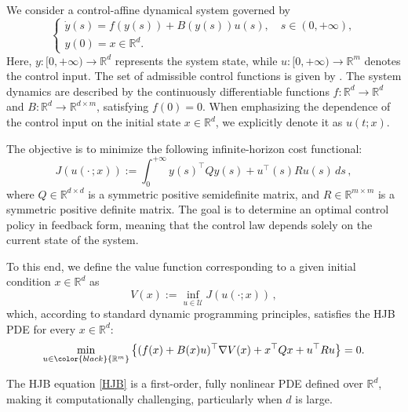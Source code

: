 \documentclass{article}
\newcommand{\second}[1]{{\color{black}{#1}}}
\begin{document}
We consider a control-affine dynamical system governed by  
\begin{equation}\label{eq}
\left\{ \begin{array}{l}
\dot{y}(s) = f(y(s)) + B(y(s)) u(s), \quad s \in (0, +\infty),\\
y(0) = x \in \mathbb{R}^d.
\end{array} \right.
\end{equation}  
Here, $y: [0, +\infty) \to \mathbb{R}^d$ represents the system state, while $u: [0, +\infty) \to \mathbb{R}^m$ denotes the control input. The set of admissible control functions is given by \second{$\mathcal{U} = L^\infty ([0, +\infty); \mathbb{R}^m)$}. The system dynamics are described by the continuously differentiable functions $f: \mathbb{R}^d \to \mathbb{R}^d$ and $B: \mathbb{R}^d \to \mathbb{R}^{d \times m}$, satisfying $f({0})  = {0}$. When emphasizing the dependence of the control input on the initial state $x \in \mathbb{R}^d$, we explicitly denote it as $u(t;x)$.  

The objective is to minimize the following infinite-horizon cost functional:  
\begin{equation}\label{cost}
 J(u(\cdot \, ;x)) := \int_0^{+\infty} y(s)^{\top} Q y(s) + u^{\top}(s) R u(s)\,ds\,,
\end{equation}  
where $Q \in \mathbb{R}^{d \times d}$ is a symmetric positive semidefinite matrix, and $R \in \mathbb{R}^{m \times m}$ is a symmetric positive definite matrix. The goal is to determine an optimal control policy in feedback form, meaning that the control law depends solely on the current state of the system.  

To this end, we define the value function corresponding to a given initial condition $x \in \mathbb{R}^d$ as  
\begin{equation}
V(x) := \inf\limits_{u\in\mathcal{U}} J(u(\cdot;x))\,,
\label{VF}
\end{equation}  
which, according to standard dynamic programming principles, satisfies the HJB PDE for every $x \in \mathbb{R}^d$:  
\begin{equation}\label{HJB}
\min\limits_{u\in \second{\mathbb{R}^m} }\left\{(f(x)+B(x)u)^{\top} \nabla V(x) + x^{\top} Q x+ u^{\top} R u \right\}=0.
\end{equation}  

The HJB equation \eqref{HJB} is a first-order, fully nonlinear PDE defined over $\mathbb{R}^d$, making it computationally challenging, particularly when $d$ is large.
\second{We remark that the finiteness of the value function is not guaranteed a priori in nonlinear infinite-horizon problems. However, as shown in the subsequent section, under suitable assumptions on the data, the SDRE feedback yields a locally exponentially stable closed-loop system, from which it follows that the associated infinite-horizon cost is finite for all initial conditions in the corresponding region of attraction.
}
\end{document}
